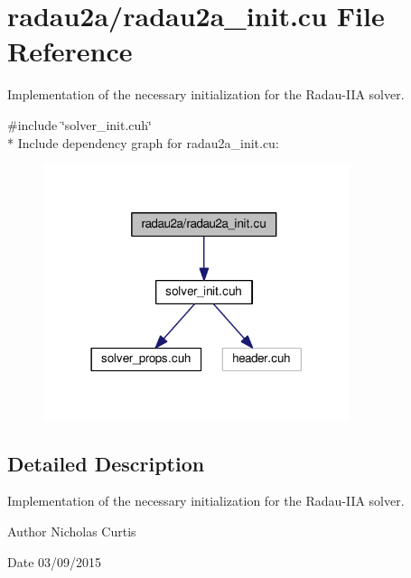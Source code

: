 \hypertarget{radau2a__init_8cu}{}\section{radau2a/radau2a\+\_\+init.cu File Reference}
\label{radau2a__init_8cu}


Implementation of the necessary initialization for the Radau-\/\+I\+IA solver.  


{\ttfamily \#include \char`\"{}solver\+\_\+init.\+cuh\char`\"{}}\\*
Include dependency graph for radau2a\+\_\+init.\+cu\+:\nopagebreak
\begin{figure}[H]
\begin{center}
\leavevmode
\includegraphics[width=254pt]{radau2a__init_8cu__incl}
\end{center}
\end{figure}


\subsection{Detailed Description}
Implementation of the necessary initialization for the Radau-\/\+I\+IA solver. 

\begin{DoxyAuthor}{Author}
Nicholas Curtis 
\end{DoxyAuthor}
\begin{DoxyDate}{Date}
03/09/2015 
\end{DoxyDate}
